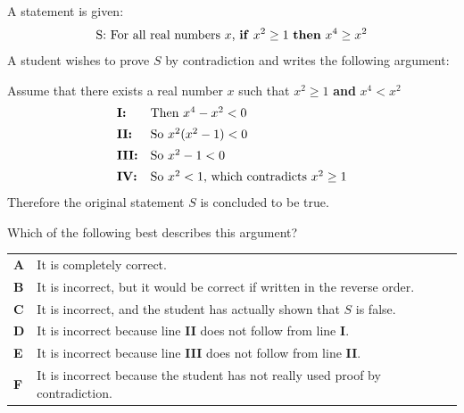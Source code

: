 \documentclass[11pt,a4paper]{article}
\begin{document}
\begin{enumerate}[label=\textbf{\arabic*.},leftmargin=*,itemsep=0pt,start=17]
A statement is given: \[\text{S: For all real numbers $x$, \textbf{if} $x^2 \ge 1$ \textbf{then} $x^4 \ge x^2$}\] A student wishes to prove $S$ by contradiction and writes the following argument:

Assume that there exists a real number $x$ such that $x^2 \ge 1$ \textbf{and} $x^4 < x^2$ \[ \begin{array}{@{}l l@{}}
\textbf{I:} & \text{Then $x^4 - x^2 < 0$} \\[5pt]
\textbf{II:} & \text{So $x^2(x^2 - 1) < 0$} \\[5pt]
\textbf{III:} & \text{So $x^2 - 1 < 0$} \\[5pt]
\textbf{IV:} & \text{So $x^2 < 1$, which contradicts $x^2 \ge 1$}
\end{array} \] Therefore the original statement $S$ is concluded to be true.

Which of the following best describes this argument?

\par\vspace*{12pt}
\begin{tabularx}{\linewidth}{@{}>{\bfseries}l Y@{}}
A &
It is completely correct.
\\[0.8em]
B &
It is incorrect, but it would be correct if written in the reverse order.
\\[0.8em]
C &
It is incorrect, and the student has actually shown that $S$ is false.
\\[0.8em]
D &
It is incorrect because line \textbf{II} does not follow from line \textbf{I}.
\\[0.8em]
E &
It is incorrect because line \textbf{III} does not follow from line \textbf{II}.
\\[0.8em]
F &
It is incorrect because the student has not really used proof by contradiction.
\\
\end{tabularx}
\end{enumerate}
\clearpage
\thispagestyle{djspaper}
\vspace*{8pt}
\end{document}
